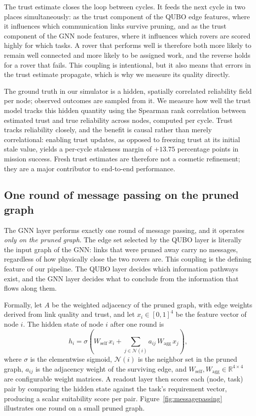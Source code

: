 The trust estimate closes the loop between cycles. It feeds the next cycle
in two places simultaneously: as the trust component of the QUBO edge
features, where it influences which communication links survive pruning, and
as the trust component of the GNN node features, where it influences which
rovers are scored highly for which tasks. A rover that performs well is
therefore both more likely to remain well connected and more likely to be
assigned work, and the reverse holds for a rover that fails. This coupling
is intentional, but it also means that errors in the trust estimate
propagate, which is why we measure its quality directly.

The ground truth in our simulator is a hidden, spatially correlated
reliability field per node; observed outcomes are sampled from it. We
measure how well the trust model tracks this hidden quantity using the
Spearman rank correlation between estimated trust and true reliability
across nodes, computed per cycle. Trust tracks reliability closely, and the
benefit is causal rather than merely correlational: enabling trust updates,
as opposed to freezing trust at its initial stale value, yields a per-cycle
staleness margin of $+13.75$ percentage points in mission success. Fresh
trust estimates are therefore not a cosmetic refinement; they are a major
contributor to end-to-end performance.

\subsection{One round of message passing on the pruned graph}

The GNN layer performs exactly one round of message passing, and it operates
\emph{only on the pruned graph}. The edge set selected by the QUBO layer is
literally the input graph of the GNN: links that were pruned away carry no
messages, regardless of how physically close the two rovers are. This
coupling is the defining feature of our pipeline. The QUBO layer decides
which information pathways exist, and the GNN layer decides what to conclude
from the information that flows along them.

Formally, let $A$ be the weighted adjacency of the pruned graph, with edge
weights derived from link quality and trust, and let $x_i \in [0,1]^4$ be
the feature vector of node $i$. The hidden state of node $i$ after one round
is
\begin{equation}
  h_i = \sigma\!\left( W_{\mathrm{self}}\, x_i
    + \sum_{j \in \mathcal{N}(i)} a_{ij}\, W_{\mathrm{agg}}\, x_j \right),
  \label{eq:messagepassing}
\end{equation}
where $\sigma$ is the elementwise sigmoid, $\mathcal{N}(i)$ is the neighbor
set in the pruned graph, $a_{ij}$ is the adjacency weight of the surviving
edge, and $W_{\mathrm{self}}, W_{\mathrm{agg}} \in \mathbb{R}^{4 \times 4}$
are configurable weight matrices. A readout layer then scores each
(node, task) pair by comparing the hidden state against the task's
requirement vector, producing a scalar suitability score per pair.
Figure~\ref{fig:messagepassing} illustrates one round on a small pruned
graph.

